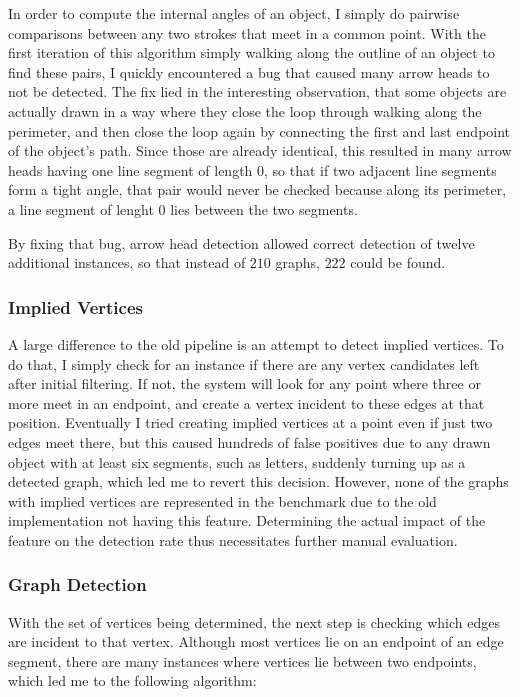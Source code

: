 \documentclass[practical,english]{info1thesis}
\begin{document}
In order to compute the internal angles of an object, I simply do pairwise comparisons between any two strokes that meet in a common point.
With the first iteration of this algorithm simply walking along the outline of an object to find these pairs, I quickly encountered a bug that caused many arrow heads to not be detected.
The fix lied in the interesting observation, that some objects are actually drawn in a way where they close the loop through walking along the perimeter, and then close the loop again by connecting the first and last endpoint of the object's path.
Since those are already identical, this resulted in many arrow heads having one line segment of length $0$, so that if two adjacent line segments form a tight angle, that pair would never be checked because along its perimeter, a line segment of lenght $0$ lies between the two segments.


By fixing that bug, arrow head detection allowed correct detection of twelve additional instances, so that instead of $210$ graphs, $222$ could be found.

\subsubsection{Implied Vertices}
A large difference to the old pipeline is an attempt to detect implied vertices. 
To do that, I simply check for an instance if there are any vertex candidates left after initial filtering.
If not, the system will look for any point where three or more meet in an endpoint, and create a vertex incident to these edges at that position.
Eventually I tried creating implied vertices at a point even if just two edges meet there, but this caused hundreds of false positives due to any drawn object with at least six segments, such as letters, suddenly turning up as a detected graph, which led me to revert this decision.
However, none of the graphs with implied vertices are represented in the benchmark due to the old implementation not having this feature.
Determining the actual impact of the feature on the detection rate thus necessitates further manual evaluation.


\subsubsection{Graph Detection}\label{sec:graph}
With the set of vertices being determined, the next step is checking which edges are incident to that vertex.
Although most vertices lie on an endpoint of an edge segment, there are many instances where vertices lie between two endpoints, which led me to the following algorithm:
\end{document}
